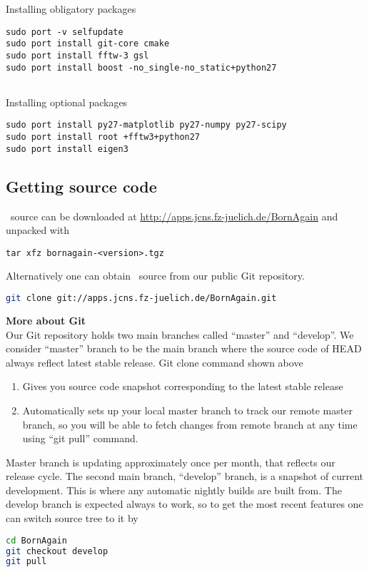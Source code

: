 \noindent
Installing obligatory packages
\begin{lstlisting}[language=shell, style=commandline]
sudo port -v selfupdate
sudo port install git-core cmake
sudo port install fftw-3 gsl
sudo port install boost -no_single-no_static+python27 


\end{lstlisting}

\noindent
Installing optional packages
\begin{lstlisting}[language=shell, style=commandline]
sudo port install py27-matplotlib py27-numpy py27-scipy
sudo port install root +fftw3+python27
sudo port install eigen3
\end{lstlisting}




\subsection{Getting source code}
\BornAgain\ source can be downloaded at \url{http://apps.jcns.fz-juelich.de/BornAgain}
and unpacked with
\begin{lstlisting}[language=shell, style=commandline]
tar xfz bornagain-<version>.tgz
\end{lstlisting}

\noindent
Alternatively one can obtain \BornAgain\ source from our public Git repository.
\begin{lstlisting}[language=bash, style=commandline]
git clone git://apps.jcns.fz-juelich.de/BornAgain.git 
\end{lstlisting}
\vspace*{3mm}


\noindent
{\bf\large More about Git} \\
Our Git repository holds two main branches called ``master'' and ``develop''. We consider ``master''
branch to be the main branch where the source code of HEAD always reflect latest stable release. Git clone command shown above
\begin{enumerate}[1.]
\item Gives you source code snapshot corresponding to the latest stable release
\item Automatically sets up your local master branch to track our remote master branch, 
so you will be able to fetch changes from remote branch at any time using ``git pull'' command.
\end{enumerate}

Master branch is updating approximately once per month, that reflects our release cycle.
The second main branch, ``develop'' branch, is a snapshot of current development.
This is where any automatic nightly builds are built from. The develop branch is
expected always to work, so to get the most recent features one can switch source tree to it by
\begin{lstlisting}[language=bash, style=commandline]
cd BornAgain
git checkout develop
git pull
\end{lstlisting}
\vspace*{3mm}



